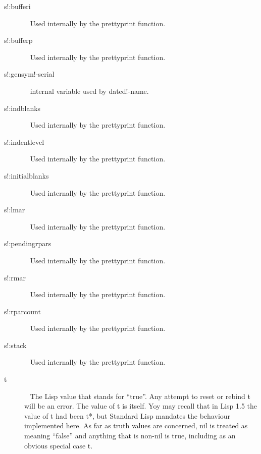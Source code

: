 \documentclass[a4paper,11pt]{article}
\begin{document}
\begin{description}
\item [{\ttfamily s!:bufferi}] ~\newline
Used internally by the prettyprint function.

\item [{\ttfamily s!:bufferp}] ~\newline
Used internally by the prettyprint function.

\item [{\ttfamily s!:gensym!-serial}]  ~\newline
internal variable used by {\ttfamily dated!-name}.

\item [{\ttfamily s!:indblanks}]  ~\newline
Used internally by the prettyprint function.

\item [{\ttfamily s!:indentlevel}] ~\newline
Used internally by the prettyprint function.

\item [{\ttfamily s!:initialblanks}] ~\newline
Used internally by the prettyprint function.

\item [{\ttfamily s!:lmar}] ~\newline
Used internally by the prettyprint function.

\item [{\ttfamily s!:pendingrpars}] ~\newline
Used internally by the prettyprint function.

\item [{\ttfamily s!:rmar}] ~\newline
Used internally by the prettyprint function.

\item [{\ttfamily s!:rparcount}] ~\newline
Used internally by the prettyprint function.

\item [{\ttfamily s!:stack}] ~\newline
Used internally by the prettyprint function.

\item [{\ttfamily t}]  ~\newline
The Lisp value that stands for ``true''. Any attempt to reset or
rebind {\ttfamily t} will be an error. The value of {\ttfamily t} is
itself. Yoy may recall that in Lisp 1.5 the value of {\ttfamily t}
had been {\ttfamily *t*}, but Standard Lisp mandates the behaviour
implemented here. As far as truth values are concerned, {\ttfamily nil}
is treated as meaning ``false'' and anything that is non-{\ttfamily nil}
is true, including as an obvious special case {\ttfamily t}.


\end{description}
\end{document}
